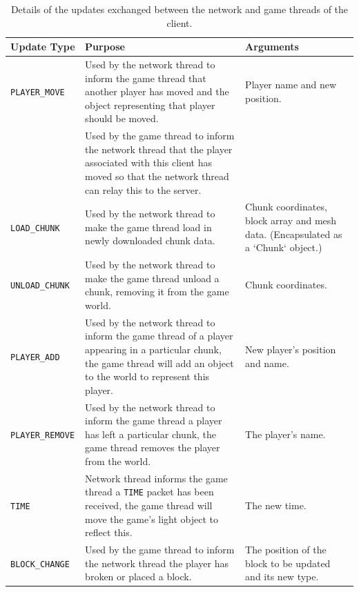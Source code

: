 \documentclass[12pt,notitlepage,a4paper]{report}
\begin{document}
	\begin{table}[!ht]
		\begin{tabularx}{\textwidth}{| l | X | p{3cm} |}
			\hline
			\bf Update Type & Purpose & Arguments \\
			\hline
			\tt PLAYER\_MOVE & Used by the network thread to inform the game thread that another player has moved and the object representing that player should be moved. & Player name and new position.\\
			\cline{2-2}
			\tt & Used by the game thread to inform the network thread that the player associated with this client has moved so that the network thread can relay this to the server. & \\
			\hline
			\tt LOAD\_CHUNK & Used by the network thread to make the game thread load in newly downloaded chunk data. & Chunk coordinates, block array and mesh data. (Encapsulated as a `Chunk` object.) \\
			\hline
			\tt UNLOAD\_CHUNK & Used by the network thread to make the game thread unload a chunk, removing it from the game world. & Chunk coordinates. \\
			\hline
			\tt PLAYER\_ADD & Used by the network thread to inform the game thread of a player appearing in a particular chunk, the game thread will add an object to the world to represent this player. & New player's position and name. \\
			\hline
			\tt PLAYER\_REMOVE & Used by the network thread to inform the game thread a player has left a particular chunk, the game thread removes the player from the world. & The player's name. \\
			\hline
			\tt TIME & Network thread informs the game thread a \texttt{TIME} packet has been received, the game thread will move the game's light object to reflect this. & The new time. \\
			\hline
			\tt BLOCK\_CHANGE & Used by the game thread to inform the network thread the player has broken or placed a block. & The position of the block to be updated and its new type.\\
			\hline
		\end{tabularx}
		\caption{Details of the updates exchanged between the network and game threads of the client.}
		\label{tab:updates}
	\end{table}
	
\end{document}

